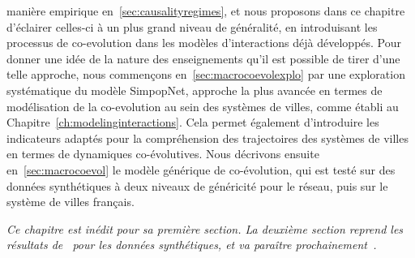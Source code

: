 manière empirique en~\ref{sec:causalityregimes}, et nous proposons dans ce chapitre d'éclairer celles-ci à un plus grand niveau de généralité, en introduisant les processus de co-evolution dans les modèles d'interactions déjà développés. Pour donner une idée de la nature des enseignements qu'il est possible de tirer d'une telle approche, nous commençons en~\ref{sec:macrocoevolexplo} par une exploration systématique du modèle SimpopNet, approche la plus avancée en termes de modélisation de la co-evolution au sein des systèmes de villes, comme établi au Chapitre~\ref{ch:modelinginteractions}. Cela permet également d'introduire les indicateurs adaptés pour la compréhension des trajectoires des systèmes de villes en termes de dynamiques co-évolutives. Nous décrivons ensuite en~\ref{sec:macrocoevol} le modèle générique de co-évolution, qui est testé sur des données synthétiques à deux niveaux de généricité pour le réseau, puis sur le système de villes français.




\stars


\textit{Ce chapitre est inédit pour sa première section. La deuxième section reprend les résultats de~\cite{} %
pour les données synthétiques, et va paraître prochainement~\cite{}. %
}















